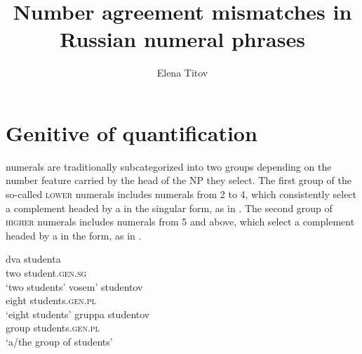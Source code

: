 \documentclass[output=paper,modfonts,newtxmath,hidelinks]{langscibook}
\title{Number agreement mismatches in Russian numeral phrases}
\author{Elena Titov\affiliation{University College London}}
\begin{document}
\maketitle

\section{Genitive of quantification}\label{18:s1}

 numerals are traditionally subcategorized into two groups depending on the number feature carried by the head of the NP they select. The first group of the so-called \textsc{lower} numerals includes numerals from 2 to 4, which consistently select a complement headed by a  in the singular  form, as in . The second group of \textsc{higher} numerals includes numerals from 5 and above, which select a complement headed by a  in the   form, as in . 


\ea \label{18:ex1}
\gll dva   studenta\\
     two  student.\textsc{gen.sg}\\
\glt `two students'
\z
\ea \label{18:ex2}
\gll vosem’  studentov\\
     eight  students.\textsc{gen.pl}\\
\glt `eight students'
\z
\ea \label{18:ex3}
\gll gruppa  studentov\\
     group   students.\textsc{gen.pl}\\
\glt `a/the group of students'
\z
\end{document}
